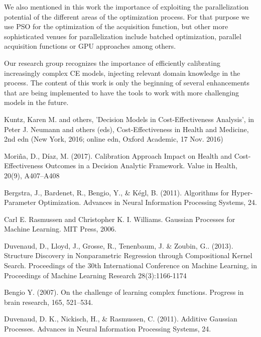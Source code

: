 \documentclass{IOS-Book-Article}
\begin{document}
	We also mentioned in this work the importance of exploiting the parallelization potential of the different areas of the optimization process. For that purpose we use PSO for the optimization of the acquisition function, but other more sophisticated venues for parallelization include batched optimization\cite{gp-batch}\cite{gp-batch2}, parallel acquisition functions\cite{gp-parallel-acq-func} or GPU approaches\cite{gp-gpu} among others.
	
	Our research group recognizes the importance of efficiently calibrating increasingly complex CE models, injecting relevant domain knowledge in the process. The content of this work is only the beginning of several enhancements that are being implemented to have the tools to work with more challenging models in the future.
	
	\begin{thebibliography}{99}
		
		Kuntz, Karen M. and others, 'Decision Models in Cost-Effectiveness Analysis', in Peter J. Neumann and others (eds), Cost-Effectiveness in Health and Medicine, 2nd edn (New York, 2016; online edn, Oxford Academic, 17 Nov. 2016)
		
		Moriña, D., Díaz, M. (2017). Calibration Approach Impact on Health and Cost-Effectiveness Outcomes in a Decision Analytic Framework. Value in Health, 20(9), A407–A408
		
		Bergstra, J., Bardenet, R., Bengio, Y., \& Kégl, B. (2011). Algorithms for Hyper-Parameter Optimization. Advances in Neural Information Processing Systems, 24.
		
		Carl E. Rasmussen and Christopher K. I. Williams. Gaussian Processes for Machine
		Learning. MIT Press, 2006.
		
		Duvenaud, D., Lloyd, J., Grosse, R., Tenenbaum, J. \& Zoubin, G.. (2013). Structure Discovery in Nonparametric Regression through Compositional Kernel Search. Proceedings of the 30th International Conference on Machine Learning, in Proceedings of Machine Learning Research 28(3):1166-1174
		
		Bengio Y. (2007). On the challenge of learning complex functions. Progress in brain research, 165, 521–534.
		
		Duvenaud, D. K., Nickisch, H., \& Rasmussen, C. (2011). Additive Gaussian Processes. Advances in Neural Information Processing Systems, 24.
		

\end{thebibliography}
\end{document}
